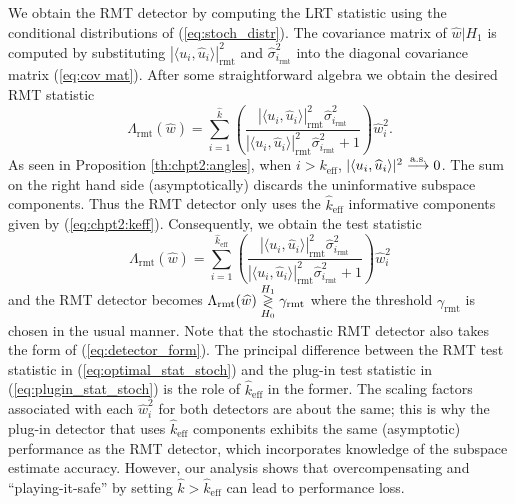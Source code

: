 We obtain the RMT detector by computing the LRT statistic using the conditional distributions of (\ref{eq:stoch_distr}). The covariance matrix of $\widehat{w}|H_1$ is computed by substituting  $|\langle u_i,\widehat{u}_i\rangle|^2_\text{rmt}$ and $\widehat{\sigma}_{i_\text{rmt}}^2$ into the diagonal covariance matrix (\ref{eq:cov mat}). After some straightforward algebra we obtain the desired RMT statistic
\begin{equation*}
\Lambda_{\text{rmt}}(\widehat{w})= \sum_{i=1}^{\widehat{k}}\left(\frac{|\langle u_i,\widehat{u}_i\rangle|^2_{\text{rmt}}\widehat{\sigma}_{i_\text{rmt}}^2}{|\langle u_i,\widehat{u}_i\rangle|^2_{\text{rmt}}\widehat{\sigma}_{i_\text{rmt}}^2 + 1}\right)\widehat{w}_i^2.
\end{equation*}
As seen in Proposition \ref{th:chpt2:angles}, when $i>k_\text{eff}$, $|\langle u_i,\widehat{u}_i\rangle|^2 \overset{\textrm{a.s.}}{\longrightarrow} 0$. The sum on the right hand side (asymptotically) discards the uninformative subspace components. Thus the RMT detector only uses the $\widehat{k}_{\text{eff}}$ informative components given by (\ref{eq:chpt2:keff}). Consequently, we obtain the test statistic
\begin{equation}\label{eq:optimal_stat_stoch}
\boxed{\Lambda_{\text{rmt}}(\widehat{w})= \sum_{i=1}^{\widehat{k}_{\text{eff}}}\left(\frac{|\langle u_i,\widehat{u}_i\rangle|^2_{\text{rmt}}\widehat{\sigma}_{i_\text{rmt}}^2}{|\langle u_i,\widehat{u}_i\rangle|^2_{\text{rmt}}\widehat{\sigma}_{i_\text{rmt}}^2 + 1}\right)\widehat{w}_i^2}
\end{equation}
and the RMT detector becomes $\Lambda_{\text{rmt}}(\widehat{w}) \overset{H_1}{\underset{H_0}{\gtrless}} \gamma_{\text{rmt}}$
where the threshold $\gamma_{\text{rmt}}$ is chosen in the usual manner. Note that the stochastic RMT detector also takes the form of (\ref{eq:detector_form}). The principal difference between the RMT test statistic in (\ref{eq:optimal_stat_stoch}) and the plug-in test statistic in (\ref{eq:plugin_stat_stoch}) is the role of $\widehat{k}_{\text{eff}}$ in the former. The scaling factors associated with each $\widehat{w}_i^{2}$ for both detectors are about the same; this is why the plug-in detector that uses $\widehat{k}_{\text{eff}}$ components exhibits the same (asymptotic) performance as the RMT detector, which incorporates knowledge of the subspace estimate accuracy. However, our analysis shows that overcompensating and ``playing-it-safe'' by setting $\widehat{k}>\widehat{k}_{\text{eff}}$ can lead to performance loss.


